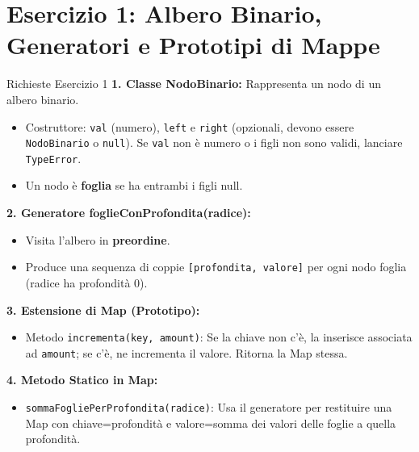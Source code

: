 \section{Esercizio 1: Albero Binario, Generatori e Prototipi di Mappe}

\begin{definition}{Richieste Esercizio 1}
\textbf{1. Classe NodoBinario:} Rappresenta un nodo di un albero binario.
\begin{itemize}
    \item Costruttore: \texttt{val} (numero), \texttt{left} e \texttt{right} (opzionali, devono essere \texttt{NodoBinario} o \texttt{null}). Se \texttt{val} non è numero o i figli non sono validi, lanciare \texttt{TypeError}.
    \item Un nodo è \textbf{foglia} se ha entrambi i figli null.
\end{itemize}
\textbf{2. Generatore foglieConProfondita(radice):} 
\begin{itemize}
    \item Visita l'albero in \textbf{preordine}.
    \item Produce una sequenza di coppie \texttt{[profondita, valore]} per ogni nodo foglia (radice ha profondità 0).
\end{itemize}
\textbf{3. Estensione di Map (Prototipo):} 
\begin{itemize}
    \item Metodo \texttt{incrementa(key, amount)}: Se la chiave non c'è, la inserisce associata ad \texttt{amount}; se c'è, ne incrementa il valore. Ritorna la Map stessa.
\end{itemize}
\textbf{4. Metodo Statico in Map:}
\begin{itemize}
    \item \texttt{sommaFogliePerProfondita(radice)}: Usa il generatore per restituire una Map con chiave=profondità e valore=somma dei valori delle foglie a quella profondità.
\end{itemize}
\end{definition}



